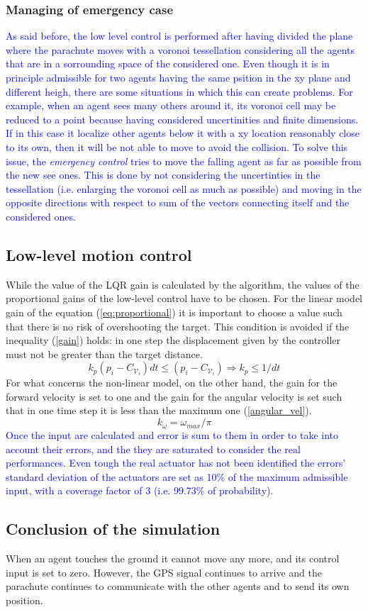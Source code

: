 \subsubsection{Managing of emergency case}
\textcolor{blue}{
As said before, the low level control is performed after having divided the plane where the parachute moves with a voronoi tessellation considering all the agents that are in a sorrounding space of the considered one. Even though it is in principle admissible for two agents having the same psition in the xy plane and different heigh, there are some situations in which this can create problems. For example, when an agent sees many others around it, its voronoi cell may be reduced to a point because having considered uncertinities and finite dimensions. If in this case it localize other agents below it with a xy location reasonably close to its own, then it will be not able to move to avoid the collision. To solve this issue, the \textit{emergency control} tries to move the falling agent as far as possible from the new see ones. This is done by not considering the uncertinties in the tessellation (i.e. enlarging the voronoi cell as much as possible) and moving in the opposite directions with respect to sum of the vectors connecting itself and the considered ones.}
\subsection{Low-level motion control}
While the value of the LQR gain is calculated by the algorithm, the values of the proportional gains of the low-level control have to be chosen. For the linear model gain of the equation (\ref{eq:proportional}) it is important to choose a value such that there is no risk of overshooting the target. This condition is avoided if the inequality (\ref{gain}) holds: in one step the displacement given by the controller must not be greater than the target distance.\\
\begin{equation}
  k_p\left(p_i - C_{\mathcal{V}_i}\right)dt \le \left(p_i - C_{\mathcal{V}_i}\right) \Rightarrow k_p \le 1/dt
  \label{gain}
\end{equation}
For what concerns the non-linear model, on the other hand, the gain for the forward velocity is set to one and the gain for the angular velocity is set such that in one time step it is less than the maximum one (\ref{angular_vel}).
\begin{equation}
  \label{angular_vel}
  k_{\omega} = \omega_{max}/\pi
\end{equation}
\textcolor{blue}{Once the input are calculated and error is sum to them in order to take into account their errors, and the they are saturated to consider the real performances. Even tough the real actuator has not been identified the errors' standard deviation of the actuators are set as 10\% of the maximum admissible input, with a coverage factor of 3 (i.e. 99.73\% of probability).}

\subsection{Conclusion of the simulation}
When an agent touches the ground it cannot move any more, and its control input is set to zero. However, the GPS signal continues to arrive and the parachute continues to communicate with the other agents and to send its own position.